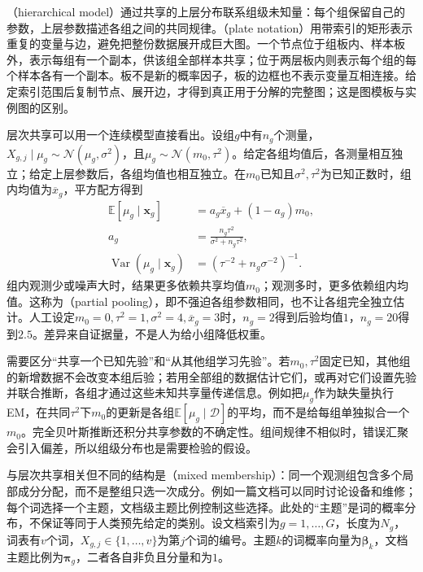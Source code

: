 （hierarchical model）通过共享的上层分布联系组级未知量：每个组保留自己的参数，上层参数描述各组之间的共同规律。（plate notation）用带索引的矩形表示重复的变量与边，避免把整份数据展开成巨大图。一个节点位于组板内、样本板外，表示每组有一个副本，供该组全部样本共享；位于两层板内则表示每个组的每个样本各有一个副本。板不是新的概率因子，板的边框也不表示变量互相连接。给定索引范围后复制节点、展开边，才得到真正用于分解的完整图；这是图模板与实例图的区别。

层次共享可以用一个连续模型直接看出。设组$g$中有$n_g$个测量，$X_{g,j}\mid\mu_g\sim\mathcal{N}(\mu_g,\sigma^2)$，且$\mu_g\sim\mathcal{N}(m_0,\tau^2)$。给定各组均值后，各测量相互独立；给定上层参数后，各组均值也相互独立。在$m_0$已知且$\sigma^2,\tau^2$为已知正数时，组内均值为$\overline x_g$，平方配方得到
\begin{equation}
  \label{eq:pgm-static-directed-pooling}
  \begin{aligned}
    \mathbb{E}[\mu_g\mid\bm{x}_g]
      &=a_g\overline x_g+(1-a_g)m_0,\\
    a_g&=\frac{n_g\tau^2}{\sigma^2+n_g\tau^2},\\
    \operatorname{Var}(\mu_g\mid\bm{x}_g)
      &=\left(\tau^{-2}+n_g\sigma^{-2}\right)^{-1}.
  \end{aligned}
\end{equation}
组内观测少或噪声大时，结果更多依赖共享均值$m_0$；观测多时，更多依赖组内均值。这称为（partial pooling），即不强迫各组参数相同，也不让各组完全独立估计。人工设定$m_0=0,\tau^2=1,\sigma^2=4,\overline x_g=3$时，$n_g=2$得到后验均值$1$，$n_g=20$得到$2.5$。差异来自证据量，不是人为给小组降低权重。

需要区分“共享一个已知先验”和“从其他组学习先验”。若$m_0,\tau^2$固定已知，其他组的新增数据不会改变本组后验；若用全部组的数据估计它们，或再对它们设置先验并联合推断，各组才通过这些未知共享量传递信息。例如把$\mu_g$作为缺失量执行EM，在共同$\tau^2$下$m_0$的更新是各组$\mathbb{E}[\mu_g\mid\mathcal{D}]$的平均，而不是给每组单独拟合一个$m_0$。完全贝叶斯推断还积分共享参数的不确定性。组间规律不相似时，错误汇聚会引入偏差，所以组级分布也是需要检验的假设。

与层次共享相关但不同的结构是（mixed membership）：同一个观测组包含多个局部成分分配，而不是整组只选一次成分。例如一篇文档可以同时讨论设备和维修；每个词选择一个主题，文档级主题比例控制这些选择。此处的“主题”是词的概率分布，不保证等同于人类预先给定的类别。设文档索引为$g=1,\ldots,G$，长度为$N_g$，词表有$v$个词，$X_{g,j}\in\{1,\ldots,v\}$为第$j$个词的编号。主题$k$的词概率向量为$\bm{\beta}_k$，文档主题比例为$\bm{\pi}_g$，二者各自非负且分量和为$1$。

